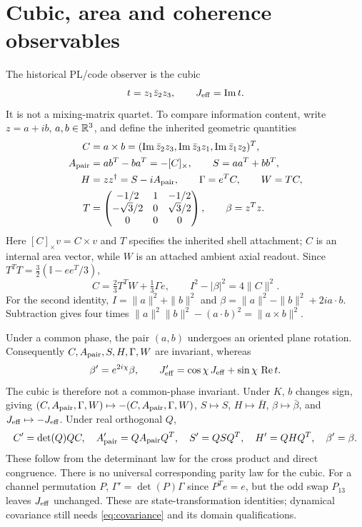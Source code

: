 \documentclass[11pt,a4paper]{article}
\numberwithin{equation}{section}
\newcommand{\re}{\operatorname{Re}}\newcommand{\rank}{\operatorname{rank}}
\newcommand{\I}{\mathbb I}\newcommand{\Argz}{\operatorname{Arg}_0}
\begin{document}
\section{Cubic, area and coherence observables}\label{sec:observables}
The historical PL/code observer is the cubic
\begin{equation}\label{eq:cubic}
 t=z_1\bar z_2z_3,\qquad J_{\rm eff}=\operatorname{Im} t.
\end{equation}
It is not a mixing-matrix quartet. To compare information content, write $z=a+ib$, $a,b\in\mathbb R^3$, and define the inherited geometric quantities \cite{pb,pg,nrg,sgo}
\begin{align}
 C&=a\times b=(\operatorname{Im}\bar z_2z_3,\operatorname{Im}\bar z_3z_1,\operatorname{Im}\bar z_1z_2)^T,\nonumber\\
 A_{\rm pair}&=ab^T-ba^T=-[C]_\times,\qquad S=aa^T+bb^T,\nonumber\\
 H&=zz^\dagger=S-iA_{\rm pair},\qquad \Gamma=e^TC,\qquad W=TC,\label{eq:observables}\\
 T&=\begin{pmatrix}-1/2&1&-1/2\\-\sqrt3/2&0&\sqrt3/2\\0&0&0\end{pmatrix},\qquad
 \beta=z^Tz.\nonumber
\end{align}
Here $[C]_\times v=C\times v$ and $T$ specifies the inherited shell attachment; $C$ is an internal area vector, while $W$ is an attached ambient axial readout. Since $T^TT=\frac32(\I-ee^T/3)$,
\begin{equation}\label{eq:arearecovery}
 C=\tfrac23 T^TW+\tfrac13\Gamma e,\qquad I^2-|\beta|^2=4\|C\|^2.
\end{equation}
For the second identity, $I=\|a\|^2+\|b\|^2$ and $\beta=\|a\|^2-\|b\|^2+2ia\mathbin{\cdot}b$. Subtraction gives four times $\|a\|^2\|b\|^2-(a\mathbin{\cdot}b)^2=\|a\times b\|^2$.

Under a common phase, the pair $(a,b)$ undergoes an oriented plane rotation. Consequently $C,A_{\rm pair},S,H,\Gamma,W$ are invariant, whereas
\begin{equation}\label{eq:phaseobserver}
 \beta' =e^{2i\chi}\beta,\qquad
 J_{\rm eff}'=\cos\chi\,J_{\rm eff}+\sin\chi\,\re t.
\end{equation}
The cubic is therefore not a common-phase invariant. Under $K$, $b$ changes sign, giving $(C,A_{\rm pair},\Gamma,W)\mapsto-(C,A_{\rm pair},\Gamma,W)$, $S\mapsto S$, $H\mapsto\bar H$, $\beta\mapsto\bar\beta$, and $J_{\rm eff}\mapsto-J_{\rm eff}$. Under real orthogonal $Q$,
\begin{equation}\label{eq:orthobserver}
 C'=\det(Q)QC,\quad A_{\rm pair}'=QA_{\rm pair}Q^T,\quad S'=QSQ^T,\quad H'=QHQ^T,\quad\beta'=\beta.
\end{equation}
These follow from the determinant law for the cross product and direct congruence. There is no universal corresponding parity law for the cubic. For a channel permutation $P$, $\Gamma'=\det(P)\Gamma$ since $P^Te=e$, but the odd swap $P_{13}$ leaves $J_{\rm eff}$ unchanged. These are state-transformation identities; dynamical covariance still needs \eqref{eq:covariance} and its domain qualifications.
\end{document}
